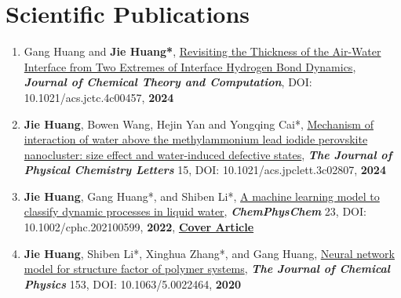 \documentclass[a4paper,10pt]{article} %
\begin{document}
%	
%
\section{Scientific Publications}  

\begin{enumerate}
\item Gang Huang and \textbf{Jie Huang*}, \href{https://arxiv.org/abs/2204.13941}{Revisiting the Thickness of the Air-Water Interface from Two Extremes of Interface Hydrogen Bond Dynamics},   \textbf{\emph{Journal of Chemical Theory and Computation}}, DOI: 10.1021/acs.jctc.4c00457,  \textbf{2024}

\item \textbf{Jie Huang}, Bowen Wang, Hejin Yan and Yongqing Cai*, \href{https://doi.org/10.1021/acs.jpclett.3c02807}{Mechanism of interaction of water above the methylammonium lead iodide perovskite nanocluster: size effect and water-induced defective states},   \textbf{\emph{The Journal of Physical Chemistry Letters}} 15, DOI: 10.1021/acs.jpclett.3c02807,  \textbf{2024}


\item \textbf{Jie Huang}, Gang Huang*, and Shiben Li*, \href{https://chemistry-europe.onlinelibrary.wiley.com/doi/abs/10.1002/cphc.202100599}{A machine learning model to classify dynamic processes in liquid water},   \textbf{\emph{ChemPhysChem}} 23, DOI: 10.1002/cphc.202100599,  \textbf{2022}, \href{https://cdn.jsdelivr.net/gh/HuangJiaLian/DataBase0@master/uPic/2022_01_05_16_CoverProfile.pdf}{\textbf{Cover Article}}


\item \textbf{Jie Huang}, Shiben Li*, Xinghua Zhang*, and Gang Huang, \href{https://aip.scitation.org/doi/10.1063/5.0022464}{Neural network model for structure factor of polymer systems},  \textbf{\emph{The Journal of Chemical Physics}} 153, DOI: 10.1063/5.0022464, \textbf{2020}
\end{enumerate}
\ 
\end{document}

